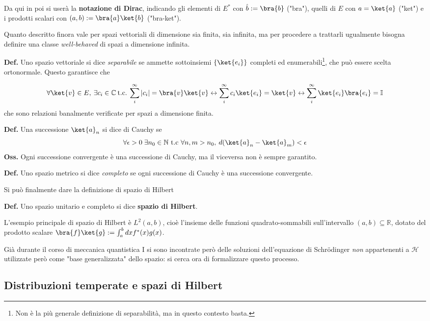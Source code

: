 Da qui in poi si userà la \textbf{notazione di Dirac}, indicando gli elementi di
$ E^* $ con $ \hat{b} := \bra{b} $ ("bra"), quelli di $ E $ con $ a = \ket{a} $ ("ket") e
i prodotti scalari con $(a,b):=\bra{a}\ket{b}$ ("bra-ket").

Quanto descritto finora vale per spazi vettoriali di dimensione sia finita, sia infinita,
ma per procedere a trattarli ugualmente bisogna definire una classe \textit{well-behaved}
di spazi a dimensione infinita.

\textbf{Def.} Uno spazio vettoriale si dice \textit{separabile} se ammette sottoinsiemi 
$ \left\{ \ket{e_i}\right\}$ completi ed enumerabili\footnote{Non è la più generale
definizione di separabilità, ma in questo contesto basta.}, che può essere scelta
ortonormale.
Questo garantisce che

$$ \forall \ket{v}\in E,\: \exists c_i \in \mathbb{C} \:\text{t.c.}\:
\sum_{i}^{\infty} |c_i| = \bra{v}\ket{v} \leftrightarrow
\sum_{i}^{\infty}c_i\ket{e_i} = \ket{v} \leftrightarrow
\sum_{i}^{\infty}\ket{e_i}\bra{e_i} = \mathbb{I}
$$
che sono relazioni banalmente verificate per spazi a dimensione finita.

\textbf{Def.} Una successione $ \ket{a}_n $ si dice di Cauchy se
$$ \forall \epsilon>0\;\exists n_0\in\mathbb{N} \text{ t.c } \forall n,m>n_0,\:
d(\ket{a}_n - \ket{a}_m)<\epsilon$$
\textbf{Oss.} Ogni successione convergente è una successione di Cauchy, ma il viceversa
non è sempre garantito.

\textbf{Def.} Uno spazio metrico si dice \textit{completo} se ogni successione di Cauchy
è una successione convergente.

Si può finalmente dare la definizione di spazio di Hilbert

\textbf{Def.} Uno spazio unitario e completo si dice \textbf{spazio di Hilbert}.

L'esempio principale di spazio di Hilbert è $ L^2(a,b) $, cioè l'insieme delle funzioni
quadrato-sommabili sull'intervallo $ (a,b)\subseteq\mathbb{R} $, dotato del prodotto
scalare $ \bra{f}\ket{g} :=\int_{a}^{b}dxf^*(x)g(x) $.

Già durante il corso di meccanica quantistica I si sono incontrate però delle soluzioni
dell'equazione di Schrödinger \textit{non} appartenenti a $ \mathcal{H} $ utilizzate
però come "base generalizzata" dello spazio: si cerca ora di formalizzare questo
processo.

\subsection{Distribuzioni temperate e spazi di Hilbert}

